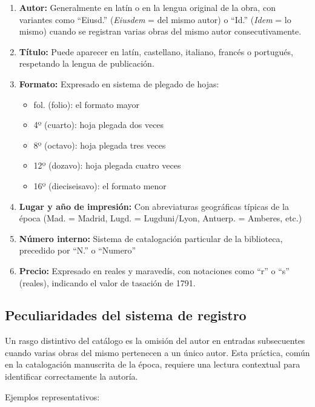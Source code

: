 \documentclass[12pt,a4paper]{article}
\begin{document}
\begin{enumerate}
\item[a)] \textbf{Autor:} Generalmente en latín o en la lengua original de la obra, con variantes como ``Eiusd.'' (\textit{Eiusdem} = del mismo autor) o ``Id.'' (\textit{Idem} = lo mismo) cuando se registran varias obras del mismo autor consecutivamente.

\item[b)] \textbf{Título:} Puede aparecer en latín, castellano, italiano, francés o portugués, respetando la lengua de publicación.

\item[c)] \textbf{Formato:} Expresado en sistema de plegado de hojas:
\begin{itemize}
    \item fol. (folio): el formato mayor
    \item 4º (cuarto): hoja plegada dos veces
    \item 8º (octavo): hoja plegada tres veces
    \item 12º (dozavo): hoja plegada cuatro veces
    \item 16º (dieciseisavo): el formato menor
\end{itemize}

\item[d)] \textbf{Lugar y año de impresión:} Con abreviaturas geográficas típicas de la época (Mad. = Madrid, Lugd. = Lugduni/Lyon, Antuerp. = Amberes, etc.)

\item[e)] \textbf{Número interno:} Sistema de catalogación particular de la biblioteca, precedido por ``N.'' o ``Numero''

\item[f)] \textbf{Precio:} Expresado en reales y maravedís, con notaciones como ``r'' o ``s'' (reales), indicando el valor de tasación de 1791.
\end{enumerate}

\subsection{Peculiaridades del sistema de registro}

Un rasgo distintivo del catálogo es la omisión del autor en entradas subsecuentes cuando varias obras del mismo pertenecen a un único autor. Esta práctica, común en la catalogación manuscrita de la época, requiere una lectura contextual para identificar correctamente la autoría.

Ejemplos representativos:
\end{document}
